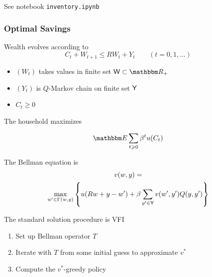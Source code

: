 \begin{frame}
    
    See notebook \texttt{inventory.ipynb}

\end{frame}


\begin{frame}
    \frametitle{Optimal Savings}

    
    Wealth evolves according to
    \begin{equation*}
        C_t + W_{t+1} \leq R W_t + Y_t 
        \qquad (t = 0, 1, \ldots)
    \end{equation*}

        \vspace{0.5em}
    \begin{itemize}
        \item $(W_t)$ takes values in finite set $\Wsf \subset \RR_+$ 
        \vspace{0.5em}
        \item $(Y_t)$ is $Q$-Markov chain on finite set $\mathsf Y$ 
        \vspace{0.5em}
        \item $C_t \geq 0$
    \end{itemize}

        \vspace{0.5em}
    The household maximizes

    \begin{equation*}
        \EE \sum_{t \geq 0} \beta^t u(C_t)
    \end{equation*}


\end{frame}

\begin{frame}
    
    The Bellman equation is
    \begin{multline*}
        v(w, y) = 
        \\
        \max_{w' \in \Gamma(w, y)}
        \left\{
            u(R w + y - w')
            + \beta \sum_{y' \in \mathsf Y} v(w', y') Q(y, y')
        \right\}
    \end{multline*}

        \vspace{0.5em}
        \vspace{0.5em}
    The standard solution procedure is VFI

    \begin{enumerate}
        \item Set up Bellman operator $T$
        \vspace{0.5em}
        \item Iterate with $T$ from some initial guess to approximate $v^*$
        \vspace{0.5em}
        \item Compute the $v^*$-greedy policy
    \end{enumerate}

\end{frame}



